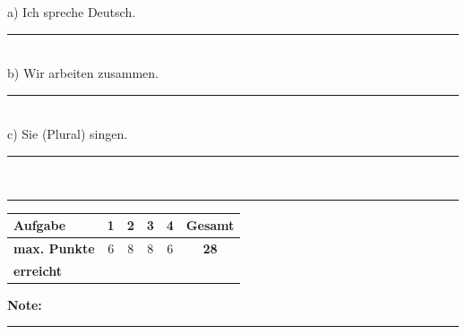 \documentclass[11pt, a4paper]{article}
\newcommand{\luecke}[1]{\rule{#1}{0.4pt}}
\begin{document}
\noindent
a) Ich spreche Deutsch. \\[1.2em]
\luecke{10cm} \\[1em]

\noindent
b) Wir arbeiten zusammen. \\[1.2em]
\luecke{10cm} \\[1em]

\noindent
c) Sie (Plural) singen. \\[1.2em]
\luecke{10cm} \\


\vspace{20pt}
\hrule
\vspace{10pt}

\noindent
\begin{tabularx}{\textwidth}{|X|c|c|c|c||c|}
\hline
\textbf{Aufgabe} & 1 & 2 & 3 & 4 & \textbf{Gesamt} \\
\hline
\textbf{max. Punkte} & 6 & 8 & 8 & 6 & \textbf{28} \\
\hline
\textbf{erreicht} & & & & & \\[0.8em]
\hline
\end{tabularx}

\vspace{10pt}

\begin{flushright}
\textbf{Note:} \luecke{2cm}
\end{flushright}
\end{document}
